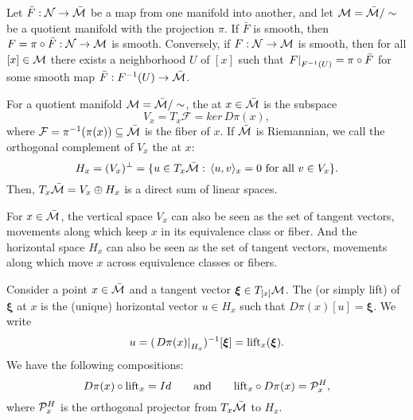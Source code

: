 \documentclass[11pt,a4paper]{article}
\begin{document}

\begin{proposition}
Let $\bar{F}:\mathcal{N}\rightarrow \bar{\mathcal{M}}$ be a map from one manifold into another, and let $\mathcal{M} = \bar{\mathcal{M}}/\sim$ be a quotient manifold with the projection $\pi$. If $\bar{F}$ is smooth, then $F = \pi\circ \bar{F}:\mathcal{N}\rightarrow \mathcal{M}$ is smooth. Conversely, if $F:\mathcal{N}\rightarrow \mathcal{M}$ is smooth, then for all $[x]\in \mathcal{M}$ there exists a neighborhood $U$ of $[x]$ such that $\left.F\right|_{F^{-1}(U)} = \pi\circ \bar{F}$ for some smooth map $\bar{F}:F^{-1}(U)\rightarrow \bar{\mathcal{M}}$. 
\end{proposition}

\begin{definition}
For a quotient manifold $\mathcal{M} = \bar{\mathcal{M}}/\sim$, the  at $x\in\bar{\mathcal{M}}$ is the subspace
\begin{equation*}
    V_x = T_x\mathcal{F} = ker\,D\pi(x),
\end{equation*}
where $\mathcal{F} = \pi^{-1}(\pi(x))\subseteq \bar{\mathcal{M}}$ is the fiber of $x$. If $\bar{\mathcal{M}}$ is Riemannian, we call the orthogonal complement of $V_x$ the  at $x$:
\begin{equation*}
H_x = (V_x)^\perp  = \{u\in T_x\bar{\mathcal{M}}:\, \langle u, v \rangle_x = 0\text{ for all }v\in V_x\}.
\end{equation*}
Then, $T_x\bar{\mathcal{M}} = V_x\oplus H_x$ is a direct sum of linear spaces.
\end{definition}

For $x\in \bar{\mathcal{M}}$, the vertical space $V_x$ can also be seen as the set of tangent vectors, movements along which keep $x$ in its equivalence class or fiber. And the horizontal space $H_x$ can also be seen as the set of tangent vectors, movements along which move $x$ across equivalence classes or fibers.

\begin{definition}
Consider a point $x\in \bar{\mathcal{M}}$ and a tangent vector $\boldsymbol\xi\in T_{[x]}\mathcal{M}$. The  (or simply lift) of $\boldsymbol\xi$ at $x$ is the (unique) horizontal vector $u\in H_x$ such that $D\pi(x)[u] = \boldsymbol\xi$. We write
\begin{equation*}
    u = (\left.D\pi(x)\right|_{H_x})^{-1}[\boldsymbol\xi] = \text{lift}_x(\boldsymbol\xi).
\end{equation*}
We have the following compositions:
\begin{equation*}
D\pi(x)\circ \text{lift}_x = Id\qquad\text{and}\qquad \text{lift}_x\circ D\pi(x) = \mathcal{P}_x^H,
\end{equation*}
where $\mathcal{P}_x^H$ is the orthogonal projector from $T_x\bar{\mathcal{M}}$ to $H_x$.
\end{definition}
\end{document}
